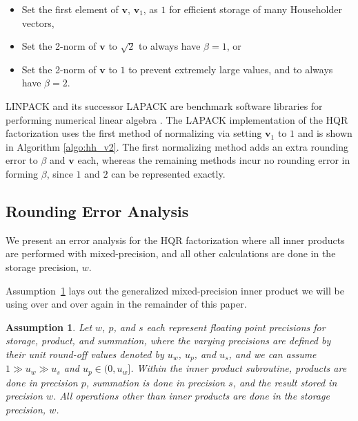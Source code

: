 \documentclass[review,onefignum,onetabnum]{siamart190516}
\newtheorem{assump}[theorem]{Assumption}
\newcommand{\bb}[1]{\mathbf{#1}}
\begin{document}
\begin{itemize}
	\item Set the first element of $\bb{v}$,  $\bb{v}_1$, as $1$ for efficient storage of many Householder vectors,
	\item Set the 2-norm of $\bb{v}$ to $\sqrt{2}$ to always have $\beta=1$, or
	\item Set the 2-norm of $\bb{v}$ to $1$ to prevent extremely large values, and to always have $\beta=2$.
\end{itemize}
LINPACK and its successor LAPACK are benchmark software libraries for performing numerical linear algebra \cite{LAPACK}. 
The LAPACK implementation of the HQR factorization uses  the first method of normalizing via setting $\bb{v}_1$ to $1$ and is shown in Algorithm \ref{algo:hh_v2}. %
The first normalizing method adds an extra rounding error to $\beta$ and $\bb{v}$ each, whereas the remaining methods incur no rounding error in forming $\beta$, since $1$ and $2$ can be represented exactly.




\subsection{Rounding Error Analysis}
\label{sec:HQRre}
We present an error analysis for the HQR factorization where all inner products are performed with mixed-precision, and all other calculations are done in the storage precision, $w$.

Assumption~\ref{assump:mp} lays out the generalized mixed-precision inner product we will be using over and over again in the remainder of this paper.

\begin{assump}
	\label{assump:mp}
	Let $w$, $p$, and $s$ each represent floating point precisions for storage, product, and summation, where the varying precisions are defined by their unit round-off values denoted by $u_w$, $u_p$, and $u_s$, and we can assume $1\gg u_w \gg u_s$ and $u_p\in (0, u_w]$. 
	Within the inner product subroutine, products are done in precision $p$, summation is done in precision $s$, and the result stored in precision $w$.
	All operations other than inner products are done in the storage precision, $w$.
\end{assump}
\end{document}
